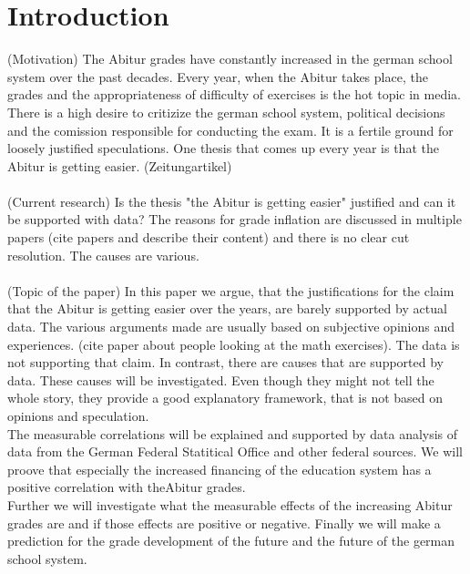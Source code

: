 \section{Introduction}
(Motivation)
The Abitur grades have constantly increased in the german school system over the past decades. Every year, when the Abitur takes place, the grades and the appropriateness of difficulty of exercises is the hot topic in media. \\
There is a high desire to critizize the german school system, political decisions and the comission responsible for conducting the exam. It is a fertile ground for loosely justified speculations. One thesis that comes up every year is that the Abitur is getting easier. (Zeitungartikel)\\\\
(Current research)
Is the thesis "the Abitur is getting easier" justified and can it be supported with data? The reasons for grade inflation are discussed in multiple papers (cite papers and describe their content) and there is no clear cut resolution. The causes are various.\\\\
(Topic of the paper)
In this paper we argue, that the justifications for the claim that the Abitur is getting easier over the years, are barely supported by actual data. The various arguments made are usually based on subjective opinions and experiences. (cite paper about people looking at the math exercises). The data is not supporting that claim. In contrast, there are causes that are supported by data. These causes will be investigated. Even though they might not tell the whole story, they provide a good explanatory framework, that is not based on opinions and speculation.\\
The measurable correlations will be explained and supported by data analysis of data from the German Federal Statitical Office and other federal sources. We will proove that especially the increased financing of the education system has a positive correlation with theAbitur grades.\\
Further we will investigate what the measurable effects of the increasing Abitur grades are and if those effects are positive or negative. Finally we will make a prediction for the grade development of the future and the future of the german school system.

